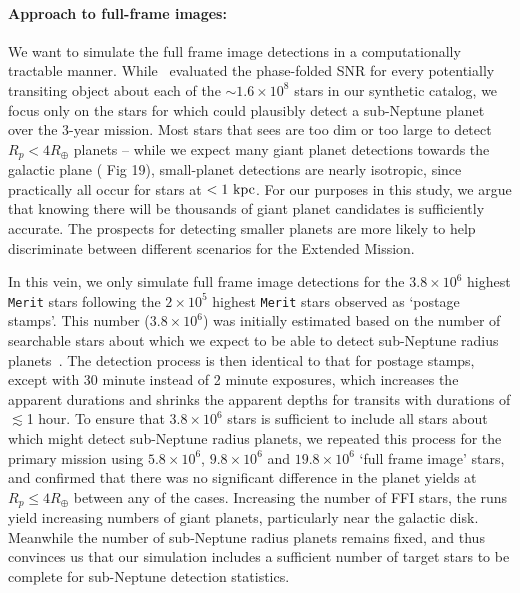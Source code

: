 \paragraph{Approach to full-frame images:}
\label{sec:FFI_simulation}
We want to simulate the full frame image detections in a
computationally tractable manner.  While~
evaluated the phase-folded SNR for every potentially transiting object
about each of the $\sim 1.6\times10^8$ stars in our synthetic catalog,
we focus only on the stars for which \tess could plausibly detect a
sub-Neptune planet over the 3-year mission.  Most stars that
\tess sees are too dim or too large to detect $R_p<4R_\oplus$ planets
-- while we expect many giant planet detections towards the galactic
plane ( Fig 19), small-planet detections are
nearly isotropic, since practically all occur for stars at
$<1\rm\ kpc$.  For our purposes in this study, we argue that knowing
there will be thousands of giant planet candidates is sufficiently
accurate. The prospects for detecting smaller planets are more likely
to help discriminate between different scenarios for the Extended Mission.

In this vein, we only simulate full frame image detections for the
$3.8\times10^6$ highest \texttt{Merit} stars following the
$2\times10^5$ highest \texttt{Merit} stars observed as `postage
stamps'.  This number ($3.8\times10^6$) was initially estimated based
on the number of searchable stars about which we expect \tess to be
able to detect sub-Neptune radius
planets~\citep{winn_searchable_2013}.  The detection process is then
identical to that for postage stamps, except with 30 minute instead of
2 minute exposures, which increases the apparent durations and shrinks
the apparent depths for transits with durations of $\lesssim$1 hour.
To ensure that $3.8\times10^6$ stars is sufficient to include all
stars about which \tess might detect sub-Neptune radius planets, we
repeated this process for the primary mission using $5.8\times10^6$,
$9.8\times10^6$ and $19.8\times10^6$ `full frame image' stars, and
confirmed that there was no significant difference in the planet
yields at $R_p\le4R_\oplus$ between any of the cases.
Increasing the number of FFI stars, the runs yield
increasing numbers of giant planets, particularly near the galactic
disk.  Meanwhile the number of sub-Neptune radius planets remains
fixed, and thus convinces us that our simulation includes a sufficient
number of target stars to be complete for sub-Neptune detection statistics.
